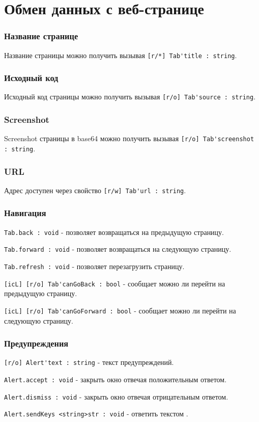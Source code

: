 \section{Обмен данных с веб-странице}
\label{dataexchange}

\subsubsection{Название странице}

Название страницы можно получить вызывая \lstinline|[r/*] Tab'title : string|.

\subsubsection{Исходный код}

Исходный код страницы можно получить вызывая \lstinline|[r/o] Tab'source : string|.

\subsubsection{Screenshot}

Screenshot страницы в base64 можно получить вызывая \lstinline|[r/o] Tab'screenshot : string|.

\subsubsection{URL}

Адрес доступен через свойство \lstinline|[r/w] Tab'url : string|.

\subsubsection{Навигация}

\lstinline|Tab.back : void| - позволяет возвращаться на предыдущую страницу.

\lstinline|Tab.forward : void| - позволяет возвращаться на следующую страницу.

\lstinline|Tab.refresh : void| -  позволяет перезагрузить страницу.

\lstinline|[icL] [r/o] Tab'canGoBack : bool| - сообщает можно ли перейти на предыдущую страницу.

\lstinline|[icL] [r/o] Tab'canGoForward : bool| - сообщает можно ли перейти на следующую страницу.


\subsubsection{Предупреждения}

\lstinline|[r/o] Alert'text : string| - текст предупреждений.

\lstinline|Alert.accept : void| - закрыть окно отвечая положительным ответом.

\lstinline|Alert.dismiss : void| - закрыть окно отвечая отрицательным ответом.

\lstinline|Alert.sendKeys <string>str : void| - ответить текстом .


